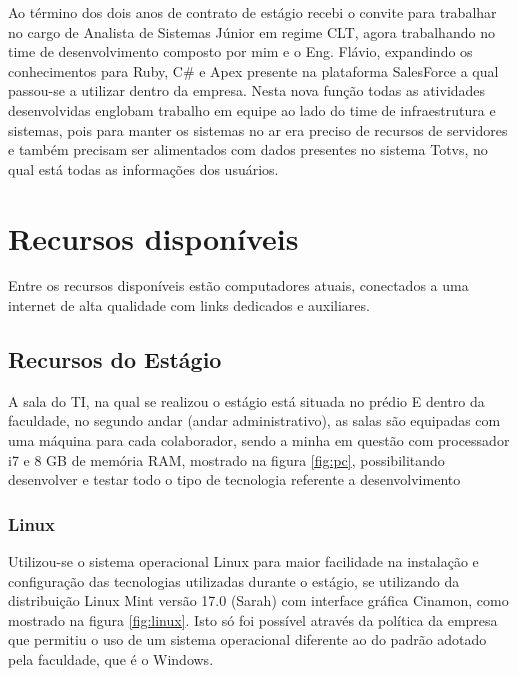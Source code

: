 \documentclass[
	12pt,				%
	oneside,			%
	a4paper,			%
	chapter=TITLE,		%
	section=TITLE,		%
	sumario=tradicional %
	english,			%
	french,				%
	spanish,			%
	brazil				%
	]{abntex2}
\begin{document}
Ao término dos dois anos de contrato de estágio recebi o convite para trabalhar no cargo de Analista de Sistemas Júnior em regime CLT, agora trabalhando no time de desenvolvimento composto por mim e o Eng. Flávio, expandindo os conhecimentos para Ruby, C\# e Apex presente na plataforma SalesForce a qual passou-se a utilizar dentro da empresa. Nesta nova função todas as atividades desenvolvidas englobam trabalho em equipe ao lado do time de infraestrutura e sistemas, pois para manter os sistemas no ar era preciso de recursos de servidores e também precisam ser alimentados com dados presentes no sistema Totvs, no qual está todas as informações dos usuários. 

\chapter{Recursos disponíveis}
\label{chap:chap4}
Entre os recursos disponíveis estão computadores atuais, conectados a uma internet de alta qualidade com links dedicados e auxiliares.

\section{Recursos do Estágio}
A sala do TI, na qual se realizou o estágio está situada no prédio E dentro da faculdade, no segundo andar (andar administrativo), as salas são equipadas com uma máquina para cada colaborador, sendo a minha em questão com processador i7 e 8 GB de memória RAM, mostrado na figura \ref{fig:pc}, possibilitando desenvolver e testar todo o tipo de tecnologia referente a desenvolvimento

\subsection{Linux}
Utilizou-se o sistema operacional Linux para maior facilidade na instalação e configuração das tecnologias utilizadas durante o estágio, se utilizando da distribuição Linux Mint versão 17.0 (Sarah) com interface gráfica Cinamon, como mostrado na figura \ref{fig:linux}. Isto só foi possível através da política da empresa que permitiu o uso de um sistema operacional diferente ao do padrão adotado pela faculdade, que é o Windows.
\end{document}
